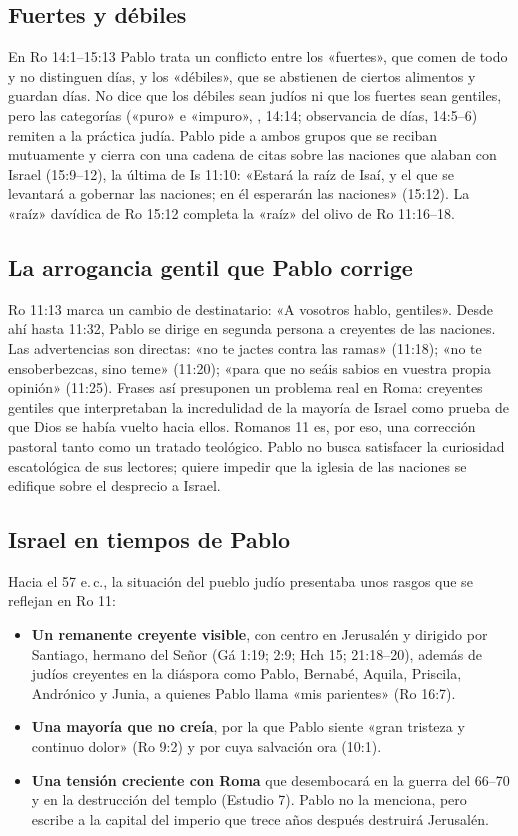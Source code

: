 \subsection{Fuertes y débiles}
En Ro 14:1--15:13 Pablo trata un conflicto entre los «fuertes», que comen de todo y no distinguen días, y los «débiles», que se abstienen de ciertos alimentos y guardan días. No dice que los débiles sean judíos ni que los fuertes sean gentiles, pero las categorías («puro» e «impuro», , 14:14; observancia de días, 14:5--6) remiten a la práctica judía. Pablo pide a ambos grupos que se reciban mutuamente y cierra con una cadena de citas sobre las naciones que alaban con Israel (15:9--12), la última de Is 11:10: «Estará la raíz de Isaí, y el que se levantará a gobernar las naciones; en él esperarán las naciones» (15:12). La «raíz» davídica de Ro 15:12 completa la «raíz» del olivo de Ro 11:16--18.

\subsection{La arrogancia gentil que Pablo corrige}
Ro 11:13 marca un cambio de destinatario: «A vosotros hablo, gentiles». Desde ahí hasta 11:32, Pablo se dirige en segunda persona a creyentes de las naciones. Las advertencias son directas: «no te jactes contra las ramas» (11:18); «no te ensoberbezcas, sino teme» (11:20); «para que no seáis sabios en vuestra propia opinión» (11:25). Frases así presuponen un problema real en Roma: creyentes gentiles que interpretaban la incredulidad de la mayoría de Israel como prueba de que Dios se había vuelto hacia ellos. Romanos 11 es, por eso, una corrección pastoral tanto como un tratado teológico. Pablo no busca satisfacer la curiosidad escatológica de sus lectores; quiere impedir que la iglesia de las naciones se edifique sobre el desprecio a Israel.

\subsection{Israel en tiempos de Pablo}
Hacia el 57 e.\,c., la situación del pueblo judío presentaba unos rasgos que se reflejan en Ro 11:
\begin{itemize}
\item \textbf{Un remanente creyente visible}, con centro en Jerusalén y dirigido por Santiago, hermano del Señor (Gá 1:19; 2:9; Hch 15; 21:18--20), además de judíos creyentes en la diáspora como Pablo, Bernabé, Aquila, Priscila, Andrónico y Junia, a quienes Pablo llama «mis parientes» (Ro 16:7).
\item \textbf{Una mayoría que no creía}, por la que Pablo siente «gran tristeza y continuo dolor» (Ro 9:2) y por cuya salvación ora (10:1).
\item \textbf{Una tensión creciente con Roma} que desembocará en la guerra del 66--70 y en la destrucción del templo (Estudio 7). Pablo no la menciona, pero escribe a la capital del imperio que trece años después destruirá Jerusalén.
\end{itemize}

